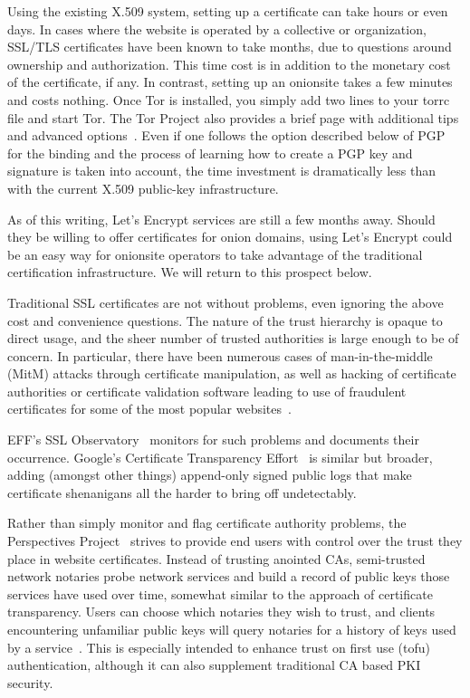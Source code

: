 \documentclass[10pt, conference, compsocconf]{styles/IEEEtran}
\begin{document}
Using the existing X.509 system, setting up a certificate can take
hours or even days. In cases where the website is operated by a
collective or organization, SSL/TLS certificates have been known to
take months, due to questions around ownership and authorization.
This time cost is in addition to the monetary cost of the certificate, if any.
In contrast, setting up an onionsite takes a few minutes and costs
nothing. Once Tor is installed, you simply add two lines to your torrc file 
and start Tor. The Tor Project also provides a brief page with
additional tips and advanced options~\cite{hs-config}.  Even if
one follows the option described below of PGP for the binding and the process
of learning how to create a PGP key and signature is taken into
account, the time investment is dramatically less than with the
current X.509 public-key infrastructure.

As of this writing, Let's Encrypt services are still a few months away.
Should they be willing to offer certificates for onion
domains, using Let's Encrypt could be an easy way for
onionsite operators to take advantage of the traditional certification
infrastructure. We will return to this prospect below.

Traditional SSL certificates are not without problems, even ignoring
the above cost and convenience questions. The nature of the trust
hierarchy is opaque to direct usage, and the sheer number of trusted
authorities is large enough to be of concern. In particular, there
have been numerous cases of man-in-the-middle (MitM) attacks through
certificate manipulation, as well as hacking of certificate
authorities or certificate validation software leading to use of
fraudulent certificates for some of the most popular
websites~\cite{forged-ssl-oakland14}.


EFF's SSL Observatory~\cite{ssl-observatory} 
monitors for such problems and documents their occurrence.
Google's Certificate Transparency
Effort~\cite{certificate-transparency} is similar but broader,
adding (amongst other things) append-only signed public
logs that make certificate shenanigans all the harder to bring off
undetectably.

Rather than simply monitor and flag certificate authority
problems, the Perspectives Project~\cite{perspectives} strives to
provide end users with control over the trust they place in website
certificates. Instead of trusting anointed CAs, semi-trusted network
notaries probe network services and build a record of public keys
those services have used over time, somewhat similar to the approach
of certificate transparency. Users can choose which notaries they wish
to trust, and clients encountering unfamiliar public keys will query
notaries for a history of keys used by a
service~\cite{perspectives-paper}. This is especially intended to
enhance trust on first use (tofu) authentication, although it can also
supplement traditional CA based PKI security. 
\end{document}
